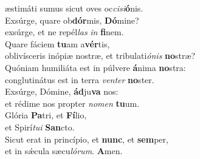\evenverse æstimáti sumus sicut oves oc\textit{ci}\textit{si}\textbf{ó}nis.\\
\oddverse Exsúrge, quare ob\textbf{dór}mis, \textbf{Dó}mine?~\*\\
\oddverse exsúrge, et ne repél\textit{las} \textit{in} \textbf{fi}nem.\\
\evenverse Quare fáciem \textbf{tu}am a\textbf{vér}tis,~\*\\
\evenverse oblivísceris inópiæ nostræ, et tribulati\textit{ó}\textit{nis} \textbf{no}stræ?\\
\oddverse Quóniam humiliáta est in púlvere \textbf{á}nima \textbf{no}stra:~\*\\
\oddverse conglutinátus est in terra \textit{ven}\textit{ter} \textbf{no}ster.\\
\evenverse Exsúrge, Dómine, \textbf{ád}ju\textbf{va} nos:~\*\\
\evenverse et rédime nos propter \textit{no}\textit{men} \textbf{tu}um.\\
\oddverse Glória \textbf{Pa}tri, et \textbf{Fí}lio,~\*\\
\oddverse et Spirí\textit{tu}\textit{i} \textbf{San}cto.\\
\evenverse Sicut erat in princípio, et \textbf{nunc}, et \textbf{sem}per,~\*\\
\evenverse et in sǽcula sæcu\textit{ló}\textit{rum}. \textbf{A}men.\\
